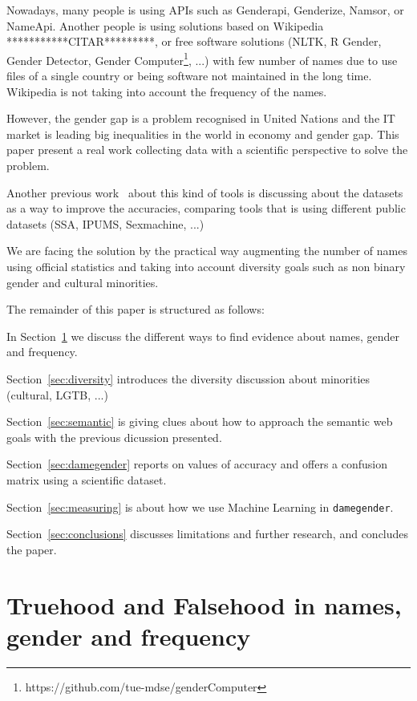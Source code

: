\documentclass[a4paper]{article}
\begin{document}
Nowadays, many people is using APIs such as Genderapi, Genderize,
Namsor, or NameApi. Another people is using solutions based on
Wikipedia ***********CITAR*********, or free software solutions
(NLTK\cite{loper2002nltk}, R Gender, Gender Detector, Gender
Computer\footnote{https://github.com/tue-mdse/genderComputer}, ...)
with few number of names due to use files of a single country or being
software not maintained in the long time. Wikipedia is not taking into
account the frequency of the names.

However, the gender gap is a problem recognised in United Nations and
the IT market is leading big inequalities in the world in economy and
gender gap. This paper present a real work collecting data with a
scientific perspective to solve the problem.

Another previous work~\cite{karimi2016inferring} about this kind of
tools is discussing about the datasets as a way to improve the
accuracies, comparing tools that is using different public datasets
(SSA, IPUMS, Sexmachine, ...)

We are facing the solution by the practical way augmenting the number
of names using official statistics and taking into account diversity
goals such as non binary gender and cultural minorities.

The remainder of this paper is structured as follows:

In Section~\ref{sec:truehood} we discuss the different ways to find
evidence about names, gender and frequency.

Section~\ref{sec:diversity} introduces the diversity discussion about
minorities (cultural, LGTB, ...)

Section~\ref{sec:semantic} is giving clues about how to approach the
semantic web goals with the previous dicussion presented.

Section~\ref{sec:damegender} reports on values of accuracy and offers
a confusion matrix using a scientific dataset.

Section~\ref{sec:measuring} is about how we use Machine Learning in
\texttt{damegender}.

Section~\ref{sec:conclusions} discusses limitations and further
research, and concludes the paper.

\section{Truehood and Falsehood in names, gender and frequency}
\label{sec:truehood}
\end{document}
